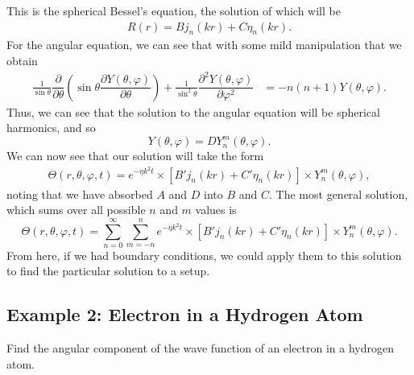 \documentclass[11pt]{report}
\newcommand{\fdel}[2]{\dfrac{\partial{#1}}{\partial {#2}}} %
\newcommand{\sdel}[2]{\dfrac{\partial^2{#1}}{\partial{#2}^2}} %
\newcommand{\fpar}[1]{\left({#1}\right)}
\newcommand{\fbrac}[1]{\left[{#1}\right]}
\begin{document}
    This is the spherical Bessel's equation, the solution of which will be
        \begin{align*}
            R(r) = Bj_n\fpar{kr}+C\eta_n(kr).
        \end{align*}
    For the angular equation, we can see that with some mild manipulation that we obtain
        \begin{align*}
            \frac{1}{\sin\theta }\fdel{}{\theta}\fpar{\sin\theta\fdel{Y(\theta,\varphi)}{\theta}}+\frac{1}{\sin^2\theta}\sdel{Y(\theta,\varphi)}{\varphi}  &= -n(n+1)Y(\theta,\varphi).
        \end{align*}
    Thus, we can see that the solution to the angular equation will be spherical harmonics, and so
        \begin{equation*}
            Y(\theta,\varphi) = DY_n^m(\theta,\varphi).
        \end{equation*}
    We can now see that our solution will take the form
        \begin{align*}
            \Theta\fpar{r,\theta,\varphi,t} = e^{-\eta k^2 t}\times\fbrac{ B'j_n\fpar{kr}+C'\eta_n(kr)}\times Y_n^m\fpar{\theta,\varphi},
        \end{align*}
    noting that we have absorbed $A$ and $D$ into $B$ and $C$. The most general solution, which sums over all possible $n$ and $m$ values is
        \begin{equation*}
            \Theta\fpar{r,\theta,\varphi,t} =\sum_{n=0}^\infty\sum_{m=-n}^n e^{-\eta k^2 t}\times\fbrac{ B'j_n\fpar{kr}+C'\eta_n(kr)}\times Y_n^m\fpar{\theta,\varphi}.
        \end{equation*}
    From here, if we had boundary conditions, we could apply them to this solution to find the particular solution to a setup.
\subsection{Example 2: Electron in a Hydrogen Atom}


Find the angular component of the wave function of an electron in a hydrogen atom.\\
\end{document}
